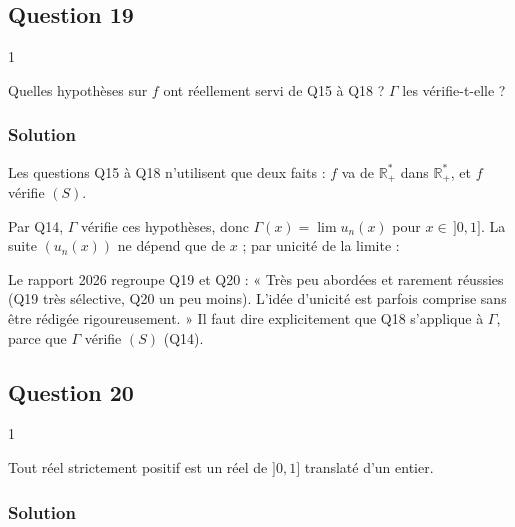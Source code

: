 \documentclass[11pt,a4paper]{article}
\newcommand{\equationajustee}[1]{%
  \sbox{\boiteequation}{$\displaystyle #1$}%
  \ifdim\wd\boiteequation>\linewidth
    \[\resizebox{\linewidth}{!}{\usebox{\boiteequation}}\]%
  \else
    \[#1\]%
  \fi}
\begin{document}
\hypertarget{question-19}{%
\subsection{Question 19}\label{question-19}}

\begin{indication}{1}

Quelles hypothèses sur \(f\) ont réellement servi de Q15 à Q18 ? \(\Gamma\) les vérifie-t-elle ?

\end{indication}

\hypertarget{solution-18}{%
\subsubsection{Solution}\label{solution-18}}

Les questions Q15 à Q18 n'utilisent que deux faits : \(f\) va de \(\mathbb R_+^*\) dans \(\mathbb R_+^*\), et \(f\) vérifie \((S)\).

Par Q14, \(\Gamma\) vérifie ces hypothèses, donc \(\Gamma(x)=\lim u_n(x)\) pour \(x\in\,]0,1]\). La suite \((u_n(x))\) ne dépend que de \(x\) ; par unicité de la limite :

\equationajustee{\boxed{\forall x\in\,]0,1],\ \ f(x)=\Gamma(x).}}

\begin{jury}

Le rapport 2026 regroupe Q19 et Q20 : « Très peu abordées et rarement réussies (Q19 très sélective, Q20 un peu moins). L'idée d'unicité est parfois comprise sans être rédigée rigoureusement. » Il faut dire explicitement que Q18 s'applique à \(\Gamma\), parce que \(\Gamma\) vérifie \((S)\) (Q14).

\end{jury}

\hypertarget{question-20}{%
\subsection{Question 20}\label{question-20}}

\begin{indication}{1}

Tout réel strictement positif est un réel de \(]0,1]\) translaté d'un entier.

\end{indication}

\hypertarget{solution-19}{%
\subsubsection{Solution}\label{solution-19}}
\end{document}
